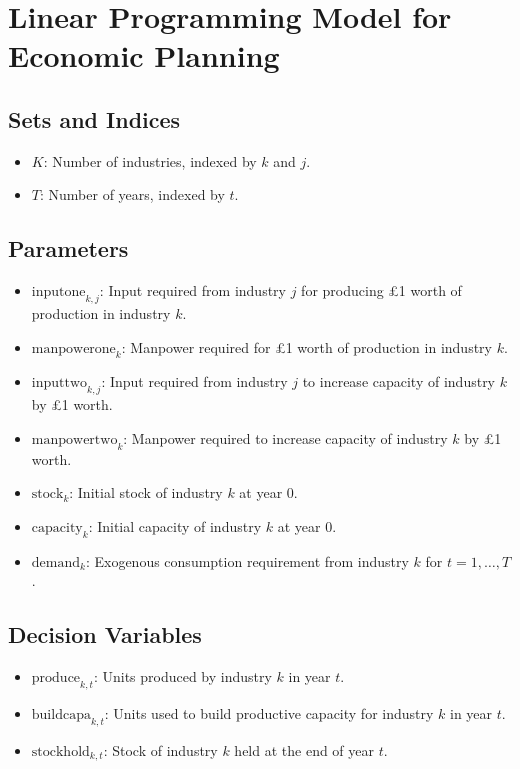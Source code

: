 \documentclass{article}
\begin{document}
\section*{Linear Programming Model for Economic Planning}

\subsection*{Sets and Indices}
\begin{itemize}
    \item $K$: Number of industries, indexed by $k$ and $j$.
    \item $T$: Number of years, indexed by $t$.
\end{itemize}

\subsection*{Parameters}
\begin{itemize}
    \item $\text{inputone}_{k,j}$: Input required from industry $j$ for producing £1 worth of production in industry $k$.
    \item $\text{manpowerone}_k$: Manpower required for £1 worth of production in industry $k$.
    \item $\text{inputtwo}_{k,j}$: Input required from industry $j$ to increase capacity of industry $k$ by £1 worth.
    \item $\text{manpowertwo}_k$: Manpower required to increase capacity of industry $k$ by £1 worth.
    \item $\text{stock}_k$: Initial stock of industry $k$ at year $0$.
    \item $\text{capacity}_k$: Initial capacity of industry $k$ at year $0$.
    \item $\text{demand}_k$: Exogenous consumption requirement from industry $k$ for $t = 1, \ldots, T$.
\end{itemize}

\subsection*{Decision Variables}
\begin{itemize}
    \item $\text{produce}_{k,t}$: Units produced by industry $k$ in year $t$.
    \item $\text{buildcapa}_{k,t}$: Units used to build productive capacity for industry $k$ in year $t$.
    \item $\text{stockhold}_{k,t}$: Stock of industry $k$ held at the end of year $t$.
\end{itemize}
\end{document}
